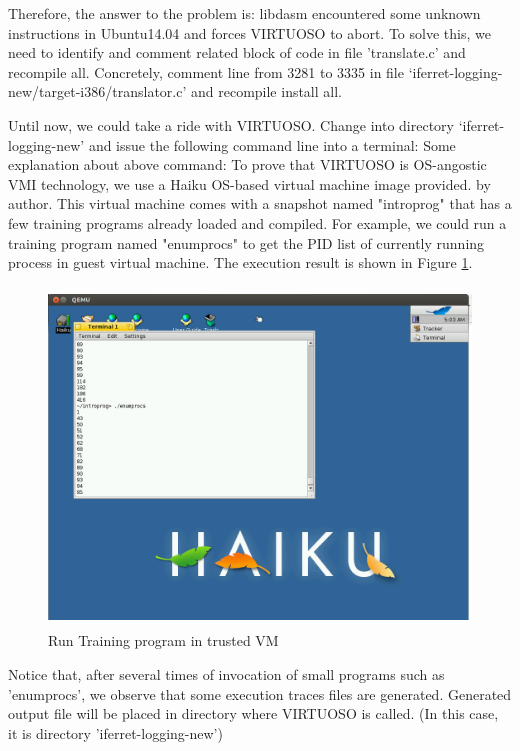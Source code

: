 Therefore, the answer to the problem is: libdasm encountered some unknown instructions in Ubuntu14.04 and forces VIRTUOSO to abort. 
To solve this, we need to identify and comment related block of code in file 'translate.c' and recompile all. Concretely, comment line 
from 3281 to 3335 in file ‘iferret-logging-new/target-i386/translator.c’ and recompile install all. 

Until now, we could take a ride with VIRTUOSO. Change into directory ‘iferret-logging-new’ and issue the following command line into a 
terminal:
Some explanation about above command: To prove that VIRTUOSO is OS-angostic VMI technology, we use a Haiku OS-based virtual machine image provided.
by author. This virtual machine comes with a snapshot named "introprog" that has a few training programs already loaded and compiled. 
For example, we could run a training program named "enumprocs" to get the PID list of currently running process in guest virtual machine.
The execution result is shown in Figure \ref{fig:Run Training program in trusted VM}.
\begin{figure}[htbp]
	\centering
		\includegraphics[width=14cm, height= 9cm ]{Figures/Figure36.png}
	\caption[Run Training program in trusted VM]{Run Training program in trusted VM}
	\label{fig:Run Training program in trusted VM}
\end{figure}

Notice that, after several times of invocation of small programs such as 'enumprocs', we observe that some execution traces files are 
generated.  Generated output file will be placed in directory where VIRTUOSO is called. (In this case, it is directory 'iferret-logging-new')

